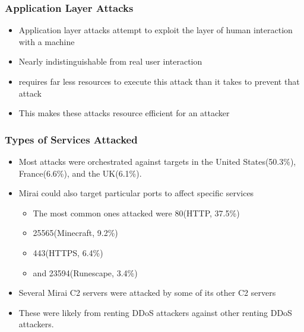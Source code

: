 \documentclass{beamer}
\begin{document}
\begin{frame}
    \frametitle{Application Layer Attacks}
        \begin{itemize}
            \item<+-> Application layer attacks attempt to exploit the layer of human interaction with a machine
            \item<+-> Nearly indistinguishable from real user interaction
            \item<+-> requires far less resources to execute this attack than it takes to prevent that attack
            \item<+-> This makes these attacks resource efficient for an attacker
    \end{itemize}
\end{frame}

\begin{frame}
    \frametitle{Types of Services Attacked}
    \begin{itemize}
        \item<+-> Most attacks were orchestrated against targets in the United States(50.3\%), France(6.6\%), and the UK(6.1\%).
        \item<+-> Mirai could also target particular ports to affect specific services
        \begin{itemize}
        		\item<+-> The most common ones attacked were 80(HTTP, 37.5\%)
        		\item<+-> 25565(Minecraft, 9.2\%)
        		\item<+-> 443(HTTPS, 6.4\%)
        		\item<+-> and 23594(Runescape, 3.4\%)
        \end{itemize}
        \item<+-> Several Mirai C2 servers were attacked by some of its other C2 servers
        \item<+-> These were likely from renting DDoS attackers against other renting DDoS attackers.
    \end{itemize}
\end{frame}
\end{document}
